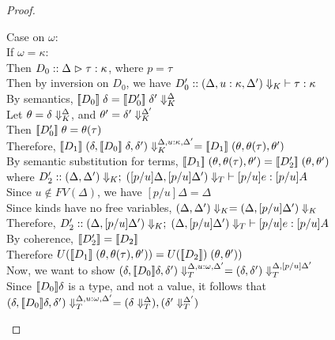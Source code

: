 \begin{proof}
\begin{enumerate}
\begin{itemize}
\begin{tabbedproof}
      \oo Case on $\omega$: \\
      \ooo If $\omega = \kappa$: \\
      \oooo Then $D_0 :: \judgeA{\tau}{\kappa}$, where $p = \tau$ \\
      \oooo Then by inversion on $D_0$, we have 
            $D'_0 :: \judgeWK[\restrictkind{\Delta, u:\kappa, \Delta'}]{\tau}{\kappa}$ \\
      \oooo By semantics, $\interp{D_0}\;\delta = \interp{D'_0}\;\restricttyenv{\Delta}{\delta'}$\\
      \oooo Let $\theta = \restricttyenv{\Delta}{\delta}$, and
                $\theta' = \restricttyenv{\Delta'}{\delta'}$ \\
      \oooo Then $\interp{D'_0}\;\theta = \theta(\tau)$ \\
      \oooo Therefore, $\interp{D_1}\;\restricttyenv{\Delta, u:\kappa, \Delta'}{(\delta, \interp{D_0}\;\delta, \delta')} = \interp{D_1}\;(\theta, \theta(\tau), \theta')$ \\
      \oooo By semantic substitution for terms, 
            $\interp{D_1}\;(\theta, \theta(\tau), \theta') = \interp{D'_2}\;(\theta,\theta')$ \\
      \oooox where $D'_2 :: \judgeE[\restrictkind{\Delta, \Delta'}]{\restricttype{[p/u]\Delta, [p/u]\Delta'}}{[p/u]e}{[p/u]A}$ \\
      \oooo Since $u \not\in FV(\Delta)$, we have $[p/u]\Delta = \Delta$ \\
      \oooo Since kinds have no free variables, $\restrictkind{\Delta, \Delta'} = \restrictkind{\Delta, [p/u]\Delta'}$ \\
      \oooo Therefore, $D'_2 :: \judgeE[\restrictkind{\Delta, [p/u]\Delta'}]{\restricttype{\Delta, [p/u]\Delta'}}{[p/u]e}{[p/u]A}$ \\
      \oooo By coherence, $\interp{D'_2} = \interp{D_2}$ \\
      \oooo Therefore $U(\interp{D_1}\;(\theta, \theta(\tau), \theta')) = U(\interp{D_2})\;(\theta,\theta'))$ \\
      \oooo Now, we want to show $\restrictvals{\Delta, u:\omega, \Delta'}{(\delta, \interp{D_0}\delta, \delta')} = \restrictvals{\Delta, [p/u]\Delta'}{(\delta, \delta')}$\\
      \oooo Since $\interp{D_0}\delta$ is a type, and not a value, it follows that \\
      \oooox $\restrictvals{\Delta, u:\omega, \Delta'}{(\delta, \interp{D_0}\delta, \delta')} = 
             (\restrictvals{\Delta}{\delta}), (\restrictvals{\Delta'}{\delta'})$ \\

\end{tabbedproof}
\end{itemize}
\end{enumerate}
\end{proof}
